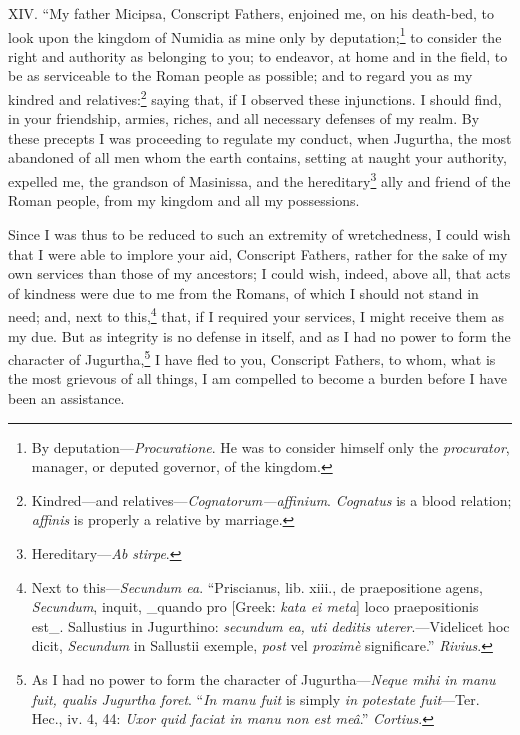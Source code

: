 XIV. ``My father Micipsa, Conscript Fathers, enjoined me, on his
death-bed, to look upon the kingdom of Numidia as mine only by
deputation;\footnote{By deputation—\emph{Procuratione}. He was to consider himself only
the \emph{procurator}, manager, or deputed governor, of the kingdom.} to consider the right and authority as belonging to
you; to endeavor, at home and in the field, to be as serviceable to
the Roman people as possible; and to regard you as my kindred and
relatives:\footnote{Kindred—and relatives—\emph{Cognatorum—affinium}. \emph{Cognatus} is
a blood relation; \emph{affinis} is properly a relative by marriage.} saying that, if I observed these injunctions. I should
find, in your friendship, armies, riches, and all necessary defenses
of my realm. By these precepts I was proceeding to regulate my conduct,
when Jugurtha, the most abandoned of all men whom the earth contains,
setting at naught your authority, expelled me, the grandson of Masinissa,
and the hereditary\footnote{Hereditary—\emph{Ab stirpe}.} ally and friend of the Roman people, from my
kingdom and all my possessions.

Since I was thus to be reduced to such an extremity of wretchedness,
I could wish that I were able to implore your aid, Conscript Fathers,
rather for the sake of my own services than those of my ancestors; I
could wish, indeed, above all, that acts of kindness were due to me
from the Romans, of which I should not stand in need; and, next to
this,\footnote{Next to this—\emph{Secundum ea}. ``Priscianus, lib. xiii., de
praepositione agens, \emph{Secundum}, inquit, \_quando pro [Greek: \emph{kata ei
meta}] loco praepositionis est\_. Sallustius in Jugurthino: \emph{secundum
ea, uti deditis uterer}.—Videlicet hoc dicit, \emph{Secundum} in Sallustii
exemple, \emph{post} vel \emph{proximè} significare.'' \emph{Rivius}.} that, if I required your services, I might receive them as
my due. But as integrity is no defense in itself, and as I had no
power to form the character of Jugurtha,\footnote{As I had no power to form the character of Jugurtha—\emph{Neque mihi
in manu fuit, qualis Jugurtha foret}. ``\emph{In manu fuit} is simply
\emph{in potestate fuit}—Ter. Hec., iv. 4, 44: \emph{Uxor quid faciat in manu
non est meâ}.'' \emph{Cortius}.} I have fled to you,
Conscript Fathers, to whom, what is the most grievous of all things, I
am compelled to become a burden before I have been an assistance.


